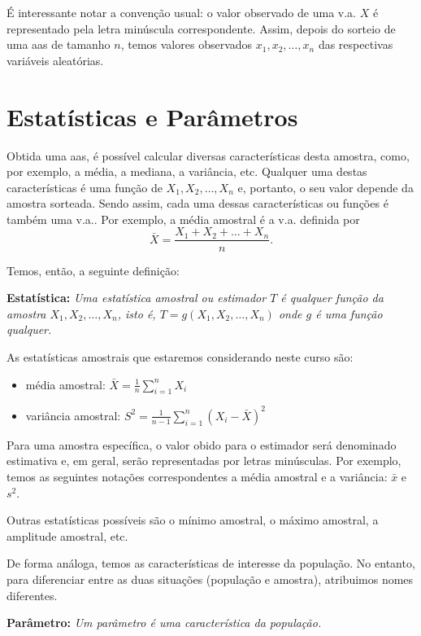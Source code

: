 \documentclass[
]{book}
\providecommand{\tightlist}{%
  \setlength{\itemsep}{0pt}\setlength{\parskip}{0pt}}
\begin{document}
É interessante notar a convenção usual: o valor observado de uma v.a. \(X\) é representado pela letra minúscula correspondente. Assim, depois do sorteio de uma aas de tamanho \(n\), temos valores observados \(x_1, x_2, \ldots, x_n\) das respectivas variáveis aleatórias.

\hypertarget{estatuxedsticas-e-paruxe2metros}{%
\section{Estatísticas e Parâmetros}\label{estatuxedsticas-e-paruxe2metros}}

Obtida uma aas, é possível calcular diversas características desta amostra, como, por exemplo, a média, a mediana, a variância, etc. Qualquer uma destas características é uma função de \(X_1, X_2, \ldots, X_n\) e, portanto, o seu valor depende da amostra sorteada. Sendo assim, cada uma dessas características ou funções é também uma v.a.. Por exemplo, a média amostral é a v.a. definida por \[\bar X = \frac{X_1+X_2+\ldots+X_n}{n}.\]

Temos, então, a seguinte definição:

\textbf{Estatística:} \emph{Uma estatística amostral ou estimador $T$ é qualquer função da
amostra $X_1, X_2, \ldots, X_n$, isto é, $T = g(X_1, X_2, \ldots, X_n)$ onde $g$ é uma função qualquer.}

As estatísticas amostrais que estaremos considerando neste curso são:

\begin{itemize}
\tightlist
\item
  média amostral: \(\bar X = \frac{1}{n}\sum_{i=1}^n X_i\)
\item
  variância amostral: \(S^2=\frac{1}{n-1}\sum_{i=1}^n (X_i-\bar X)^2\)
\end{itemize}

Para uma amostra específica, o valor obido para o estimador será denominado estimativa e, em geral, serão representadas por letras minúsculas. Por exemplo, temos as seguintes notações correspondentes a média amostral e a variância: \(\bar x\) e \(s^2\).

Outras estatísticas possíveis são o mínimo amostral, o máximo amostral, a amplitude amostral, etc.

De forma análoga, temos as características de interesse da população. No entanto, para diferenciar entre as duas situações (população e amostra), atribuimos nomes diferentes.

\textbf{Parâmetro:} \emph{Um parâmetro é uma característica da população.}
\end{document}
